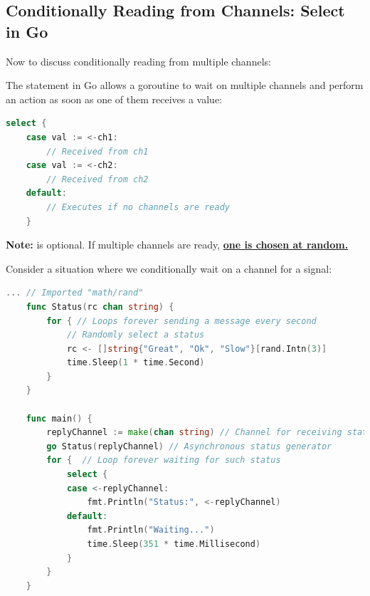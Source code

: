 \newpage 

\subsection{Conditionally Reading from Channels: Select in Go}

Now to discuss conditionally reading from multiple channels:

\begin{Def}

    The  statement in Go allows a goroutine to wait on multiple channels and perform an action as soon as one of them receives a value:
    \begin{lstlisting}[language=Go]
    select {
    case val := <-ch1:
        // Received from ch1
    case val := <-ch2:
        // Received from ch2
    default:
        // Executes if no channels are ready
    }
    \end{lstlisting}

    \noindent
    \textbf{Note:}  is optional. If multiple channels are ready, \underline{\textbf{one is chosen at random.}}
    \end{Def}
    
    \vspace{-.5em}
\begin{Example}
    
    Consider a situation where we conditionally wait on a channel for a signal:
    \begin{lstlisting}[language=Go, numbers=none]
    ... // Imported "math/rand"
    func Status(rc chan string) {
        for { // Loops forever sending a message every second
            // Randomly select a status
            rc <- []string{"Great", "Ok", "Slow"}[rand.Intn(3)]
            time.Sleep(1 * time.Second)
        }
    }

    func main() {
        replyChannel := make(chan string) // Channel for receiving status
        go Status(replyChannel) // Asynchronous status generator
        for {  // Loop forever waiting for such status
            select {
            case <-replyChannel:
                fmt.Println("Status:", <-replyChannel)
            default:
                fmt.Println("Waiting...")
                time.Sleep(351 * time.Millisecond)
            }
        }
    }
    \end{lstlisting}
    \end{Example}


